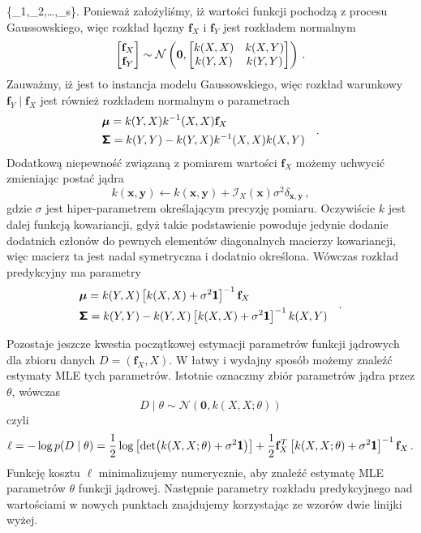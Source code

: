 \documentclass{myclass}
\begin{document}
\{_1,_2,\ldots,_s\}\). Ponieważ założyliśmy, iż wartości funkcji
pochodzą z procesu Gaussowskiego, więc rozkład łączny \(\mathbf{f}_X\) i \(\mathbf{f}_Y\) jest
rozkładem normalnym
\begin{equation*}
    \mqty[\mathbf{f}_X \\ \mathbf{f}_Y] \sim \mathcal{N}\left(\mathbf{0}, \mqty[k(X,X) & k(X,Y) \\ k(Y,X) & k(Y,Y)]\right)\,.
\end{equation*}
Zauważmy, iż jest to instancja modelu Gaussowskiego, więc rozkład warunkowy \(\mathbf{f}_Y\mid
\mathbf{f}_X\) jest również rozkładem normalnym o parametrach
\begin{equation*}
    \begin{split}
        &\boldsymbol{\mu} = k(Y,X)k^{-1}(X,X)\mathbf{f}_X\\
        &\boldsymbol{\mathsf{\Sigma}} = k(Y,Y) - k(Y,X)k^{-1}(X,X)k(X,Y)
    \end{split}\quad.
\end{equation*}
Dodatkową niepewność związaną z pomiarem wartości \(\mathbf{f}_X\) możemy uchwycić zmieniając postać
jądra 
\begin{equation*}
    k(\mathbf{x},\mathbf{y}) \leftarrow k(\mathbf{x},\mathbf{y}) + \mathcal{I}_X(\mathbf{x})\sigma^2\delta_{\mathbf{x},\mathbf{y}}\,,
\end{equation*}
gdzie \(\sigma\) jest hiper-parametrem określającym precyzję pomiaru. Oczywiście \(k\) jest dalej
funkcją kowariancji, gdyż takie podstawienie powoduje jedynie dodanie dodatnich członów do pewnych
elementów diagonalnych macierzy kowariancji, więc macierz ta jest nadal symetryczna i dodatnio
określona. Wówczas rozkład predykcyjny ma parametry
\begin{equation*}
    \begin{split}
        &\boldsymbol{\mu} = k(Y,X)\left[k(X,X) + \sigma^2\boldsymbol{\mathsf{1}}\right]^{-1}\mathbf{f}_X\\
        &\boldsymbol{\mathsf{\Sigma}} = k(Y,Y) - k(Y,X)\left[k(X,X) + \sigma^2\boldsymbol{\mathsf{1}}\right]^{-1}k(X,Y)
    \end{split}\quad.
\end{equation*}

Pozostaje jeszcze kwestia początkowej estymacji parametrów funkcji jądrowych dla zbioru danych \(D =
(\mathbf{f}_X, X)\). W łatwy i wydajny sposób możemy znaleźć estymaty MLE tych parametrów. Istotnie
oznaczmy zbiór parametrów jądra przez \(\theta\), wówczas
\begin{equation*}
    D \mid \theta \sim \mathcal{N}(\mathbf{0}, k(X,X; \theta))
\end{equation*}
czyli
\begin{equation*}
    \ell = -\log p(D \mid \theta) = \frac{1}{2}\log\left[\det (k(X,X;\theta)+\sigma^2\boldsymbol{\mathsf{1}})\right] + \frac{1}{2}\mathbf{f}_X^T\left[k(X,X;\theta) + \sigma^2\boldsymbol{\mathsf{1}}\right]^{-1}\mathbf{f}_X\,.
\end{equation*}
Funkcję kosztu \(\ell\) minimalizujemy numerycznie, aby znaleźć estymatę MLE parametrów \(\theta\)
funkcji jądrowej. Następnie parametry rozkładu predykcyjnego nad wartościami w nowych punktach
znajdujemy korzystając ze wzorów dwie linijki wyżej.
\end{document}
